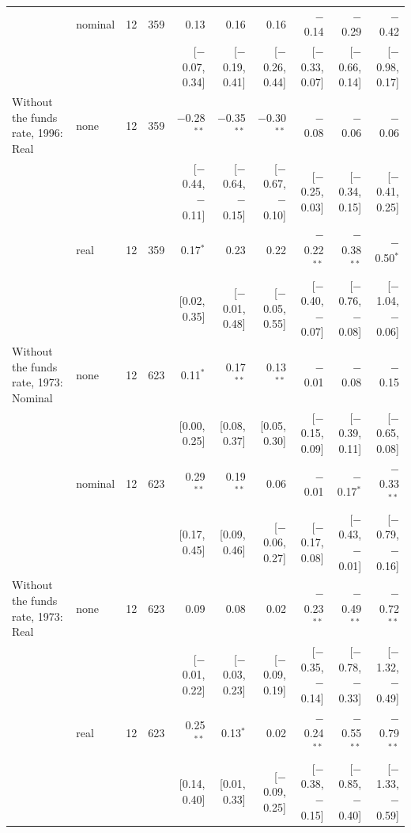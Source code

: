 \begin{table}[tp]
{\begin{tabular}{llcrrrrrrr}
 & nominal & 12 & 359 & 0.13 & 0.16 & 0.16 & $-$0.14 & $-$0.29 & $-$0.42\\
 & & & & {\scriptsize [$-$0.07, 0.34]} & {\scriptsize [$-$0.19, 0.41]} & {\scriptsize [$-$0.26, 0.44]} & {\scriptsize [$-$0.33, 0.07]} & {\scriptsize [$-$0.66, 0.14]} & {\scriptsize [$-$0.98, 0.17]}\\
\addlinespace
Without the funds rate, 1996: Real & none & 12 & 359 & $-$0.28$^{**}$ & $-$0.35$^{**}$ & $-$0.30$^{**}$ & $-$0.08 & $-$0.06 & $-$0.06\\
 & & & & {\scriptsize [$-$0.44, $-$0.11]} & {\scriptsize [$-$0.64, $-$0.15]} & {\scriptsize [$-$0.67, $-$0.10]} & {\scriptsize [$-$0.25, 0.03]} & {\scriptsize [$-$0.34, 0.15]} & {\scriptsize [$-$0.41, 0.25]}\\
 & real & 12 & 359 & 0.17$^{*}$ & 0.23 & 0.22 & $-$0.22$^{**}$ & $-$0.38$^{**}$ & $-$0.50$^{*}$\\
 & & & & {\scriptsize [0.02, 0.35]} & {\scriptsize [$-$0.01, 0.48]} & {\scriptsize [$-$0.05, 0.55]} & {\scriptsize [$-$0.40, $-$0.07]} & {\scriptsize [$-$0.76, $-$0.08]} & {\scriptsize [$-$1.04, $-$0.06]}\\
\addlinespace
Without the funds rate, 1973: Nominal & none & 12 & 623 & 0.11$^{*}$ & 0.17$^{**}$ & 0.13$^{**}$ & $-$0.01 & $-$0.08 & $-$0.15\\
 & & & & {\scriptsize [0.00, 0.25]} & {\scriptsize [0.08, 0.37]} & {\scriptsize [0.05, 0.30]} & {\scriptsize [$-$0.15, 0.09]} & {\scriptsize [$-$0.39, 0.11]} & {\scriptsize [$-$0.65, 0.08]}\\
 & nominal & 12 & 623 & 0.29$^{**}$ & 0.19$^{**}$ & 0.06 & $-$0.01 & $-$0.17$^{*}$ & $-$0.33$^{**}$\\
 & & & & {\scriptsize [0.17, 0.45]} & {\scriptsize [0.09, 0.46]} & {\scriptsize [$-$0.06, 0.27]} & {\scriptsize [$-$0.17, 0.08]} & {\scriptsize [$-$0.43, $-$0.01]} & {\scriptsize [$-$0.79, $-$0.16]}\\
\addlinespace
Without the funds rate, 1973: Real & none & 12 & 623 & 0.09 & 0.08 & 0.02 & $-$0.23$^{**}$ & $-$0.49$^{**}$ & $-$0.72$^{**}$\\
 & & & & {\scriptsize [$-$0.01, 0.22]} & {\scriptsize [$-$0.03, 0.23]} & {\scriptsize [$-$0.09, 0.19]} & {\scriptsize [$-$0.35, $-$0.14]} & {\scriptsize [$-$0.78, $-$0.33]} & {\scriptsize [$-$1.32, $-$0.49]}\\
 & real & 12 & 623 & 0.25$^{**}$ & 0.13$^{*}$ & 0.02 & $-$0.24$^{**}$ & $-$0.55$^{**}$ & $-$0.79$^{**}$\\
 & & & & {\scriptsize [0.14, 0.40]} & {\scriptsize [0.01, 0.33]} & {\scriptsize [$-$0.09, 0.25]} & {\scriptsize [$-$0.38, $-$0.15]} & {\scriptsize [$-$0.85, $-$0.40]} & {\scriptsize [$-$1.33, $-$0.59]}\\

\end{tabular}}
\end{table}
